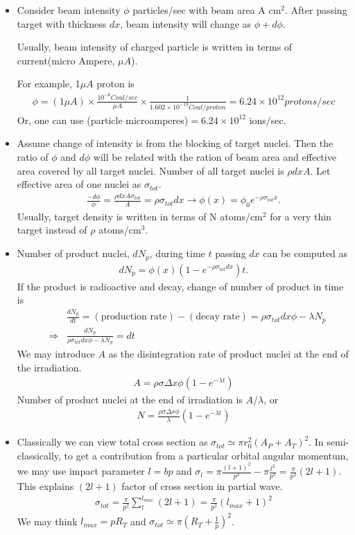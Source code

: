 \documentclass[11pt]{book}
\newcommand{\bea}{\begin{eqnarray}}
\newcommand{\eea}{\end{eqnarray}}
\newcommand{\no}{\nonumber \\}
\begin{document}
\begin{itemize}
	\item Consider beam intensity $\phi$ particles/sec with beam area A cm$^2$. After passing target
	with thickness $dx$, beam intensity will change as $\phi+d\phi$. 
	
	Usually, beam intensity of charged particle is written in terms of current(micro Ampere, $\mu A$). 
	
	For example, 1$\mu A$ proton is 
	\bea 
	\phi = (1\mu A)\times \frac{10^{-6} Coul/sec}{\mu A} \times \frac{1}{1.602\times 10^{-19} Coul/proton}
	=6.24 \times 10^{12} protons/sec
	\eea 
	Or, one can use (particle microamperes)$=6.24 \times 10^{12}$ ions/sec.
	
	\item Assume change of intensity is from the blocking of target nuclei. Then the ratio of 
	$\phi$ and $d\phi$ will be related with the ration of beam area and effective area covered by 
	all target nuclei. Number of all target nuclei is $\rho dx A$. Let effective area of one nuclei
	as $\sigma_{tot}$.      
	\bea 
	\frac{-d\phi}{\phi}=\frac{\rho dx A \sigma_{tot} }{A}= \rho \sigma_{tot} dx
	\to \phi(x) =\phi_0 e^{-\rho \sigma_{tot} x}.
	\eea 
	Usually, target density is written in terms of N atoms/cm$^2$ for a very thin target 
	instead of $\rho$ atoms/cm$^3$.  	
	\item Number of product nuclei, $d N_{p}$,  during time $t$ passing $dx$ can be computed as 
	\bea 
	d N_{p}=\phi(x)(1-e^{-\rho \sigma_{tot} dx}) t. 
	\eea 
	If the product is radioactive and decay, change of number of product in time is 
	\bea 
	& &\frac{ d N_p}{dt}=(\mbox{production rate})-(\mbox{decay rate})
	= \rho \sigma_{tot} dx \phi -\lambda N_p \no 
	&\Rightarrow& \frac{dN_p}{\rho \sigma_{tot} dx \phi -\lambda N_p}=dt                 
	\eea 
	We may introduce $A$ as the disintegration rate of product nuclei at the end of the irradiation.
	\bea 
	A=\rho \sigma\Delta x \phi (1-e^{-\lambda t}) 
	\eea 
	Number of product nuclei at the end of irradiation is $A/\lambda$, or 
	\bea 
	N=\frac{\rho \sigma\Delta x \phi}{\lambda} (1-e^{-\lambda t}) 
	\eea 
	\item Classically we can view total cross section as $\sigma_{tot}\simeq \pi r_0^2(A_P+A_T)^2$.
	  In semi-classically, to get a contribution from a particular orbital angular momentum, 
	  we may use impact parameter $l=bp$ and $\sigma_l=\pi \frac{(l+1)^2}{p^2}-\pi \frac{l^2}{p^2}=\frac{\pi}{p^2}(2l+1)$. 
	  This explains $(2l+1)$ factor of cross section in partial wave.  
	  \bea 
	  \sigma_{tot}=\frac{\pi}{p^2}\sum_{l}^{l_{max}}(2l+1)=\frac{\pi}{p^2}(l_{max}+1)^2
	  \eea 
	   We may think  $l_{max}=p R_T$ and $\sigma_{tot}\simeq \pi(R_T+\frac{1}{p})^2$.
	         

\end{itemize}
\end{document}
